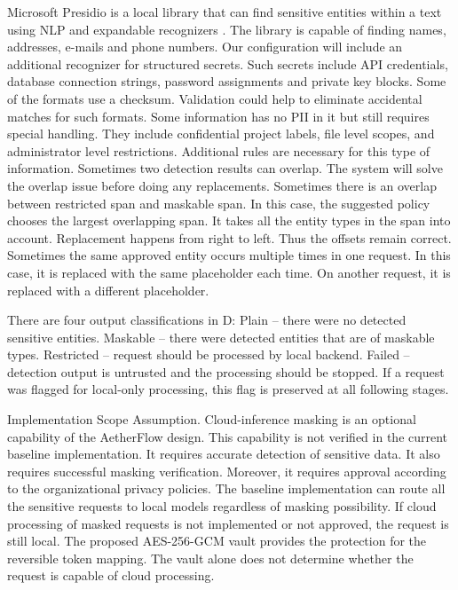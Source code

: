 \documentclass{FastFyp}
\begin{document}
Microsoft Presidio is a local library that can find sensitive entities within a text using NLP and expandable recognizers \cite{ref:Presidio}.
The library is capable of finding names, addresses, e-mails and phone numbers.
Our configuration will include an additional recognizer for structured secrets.
Such secrets include API credentials, database connection strings, password assignments and private key blocks.
Some of the formats use a checksum.
Validation could help to eliminate accidental matches for such formats.
Some information has no PII in it but still requires special handling.
They include confidential project labels, file level scopes, and administrator level restrictions.
Additional rules are necessary for this type of information.
Sometimes two detection results can overlap.
The system will solve the overlap issue before doing any replacements.
Sometimes there is an overlap between restricted span and maskable span.
In this case, the suggested policy chooses the largest overlapping span.
It takes all the entity types in the span into account.
Replacement happens from right to left.
Thus the offsets remain correct.
Sometimes the same approved entity occurs multiple times in one request.
In this case, it is replaced with the same placeholder each time.
On another request, it is replaced with a different placeholder.

There are four output classifications in D:
Plain – there were no detected sensitive entities.
Maskable – there were detected entities that are of maskable types.
Restricted – request should be processed by local backend.
Failed – detection output is untrusted and the processing should be stopped.
If a request was flagged for local-only processing, this flag is preserved at all following stages.

\noindent Implementation Scope Assumption. Cloud-inference masking is an optional capability of the AetherFlow design.
This capability is not verified in the current baseline implementation.
It requires accurate detection of sensitive data.
It also requires successful masking verification.
Moreover, it requires approval according to the organizational privacy policies.
The baseline implementation can route all the sensitive requests to local models regardless of masking possibility.
If cloud processing of masked requests is not implemented or not approved, the request is still local.
The proposed AES-256-GCM vault provides the protection for the reversible token mapping.
The vault alone does not determine whether the request is capable of cloud processing.
\end{document}

